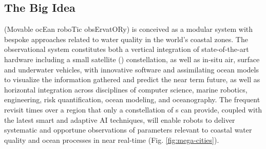 




\subsection{The Big Idea}

\pro (Movable ocEan roboTic obsErvatORy) is conceived as a modular
system with bespoke approaches related to water quality in the world’s
coastal zones.  The observational system constitutes both a vertical
integration of state-of-the-art hardware including a small satellite
(\smle) constellation, as well as in-situ air, surface and underwater
vehicles, with innovative software and assimilating ocean models to
visualize the information gathered and predict the near term future,
as well as horizontal integration across disciplines of computer
science, marine robotics, engineering, risk quantification, ocean modeling, and
oceanography. The frequent revisit times over a region that only a
constellation of \smle s can provide, coupled with the latest smart
and adaptive AI techniques, will enable robots to deliver systematic
and opportune observations of parameters relevant to coastal water
quality and ocean processes in near real-time
(Fig. \ref{fig:mega-cities}).

